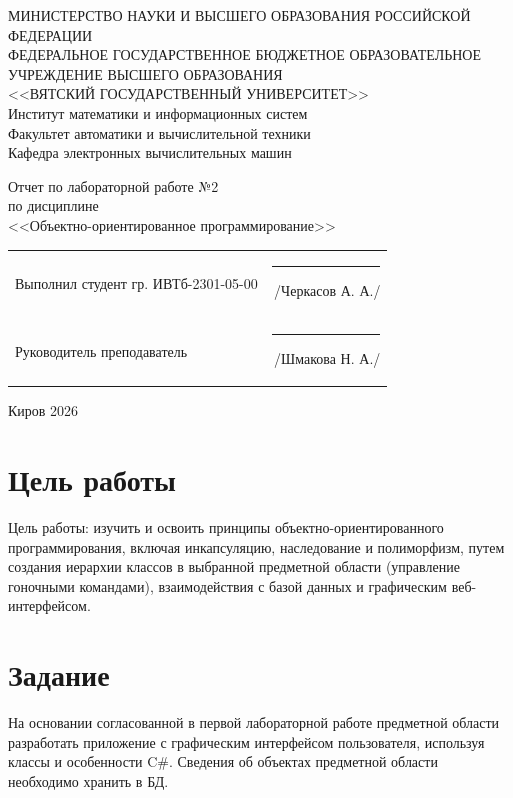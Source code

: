 \documentclass[oneside,a4paper,14pt]{extarticle}
\begin{document}
\newpage\thispagestyle{empty}
\begin{center}
  \MakeUppercase{
    Министерство науки и высшего образования Российской Федерации\\
    Федеральное государственное бюджетное образовательное учреждение высшего образования\\
    <<Вятский Государственный Университет>>\\
  }
  Институт математики и информационных систем\\
  Факультет автоматики и вычислительной техники\\
  Кафедра электронных вычислительных машин
\end{center}
\vfill

\begin{center}
  Отчет по лабораторной работе №2\\
  по дисциплине\\
  <<Объектно-ориентированное программирование>>\\
\end{center}
\vfill

\noindent
\begin{tabular}{ll}
  Выполнил студент гр. ИВТб-2301-05-00 \hspace{5mm} & \rule[-1mm]{25mm}{0.10mm}\,/Черкасов А. А./ \\
  Руководитель преподаватель                        & \rule[-1mm]{25mm}{0.10mm}\,/Шмакова Н. А./  \\
\end{tabular}

\vfill
\begin{center}
  Киров 2026
\end{center}

\newpage
\section*{\hspace{12.5mm}Цель работы}
Цель работы: изучить и освоить принципы объектно-ориентированного программирования, включая инкапсуляцию, наследование и полиморфизм, путем создания иерархии классов в выбранной предметной области (управление гоночными командами), взаимодействия с базой данных и графическим веб-интерфейсом.

\section*{\hspace{12.5mm}Задание}
На основании согласованной в первой лабораторной работе предметной области разработать приложение с графическим интерфейсом пользователя, используя классы и особенности C\#. Сведения об объектах предметной области необходимо хранить в БД.
\end{document}
